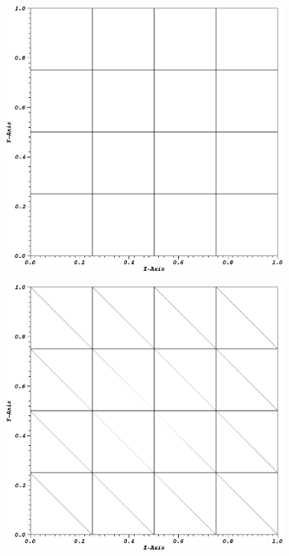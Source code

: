 \begin{figure}
\centering
{
	\begin{subfigure}[b]{0.485\textwidth}
		\centering
		\label{subfig::PA_Mesh_Tri}
		\includegraphics[width=\textwidth]{figures/sec_BF/PAMesh_Cart.png}
	\end{subfigure}
	\hfill
	\begin{subfigure}[b]{0.485\textwidth}
		\centering
		\label{subfig::PA_Mesh_Cart}
		\includegraphics[width=\textwidth]{figures/sec_BF/PAMesh_Tri.png}

\end{subfigure}}
\end{figure}
